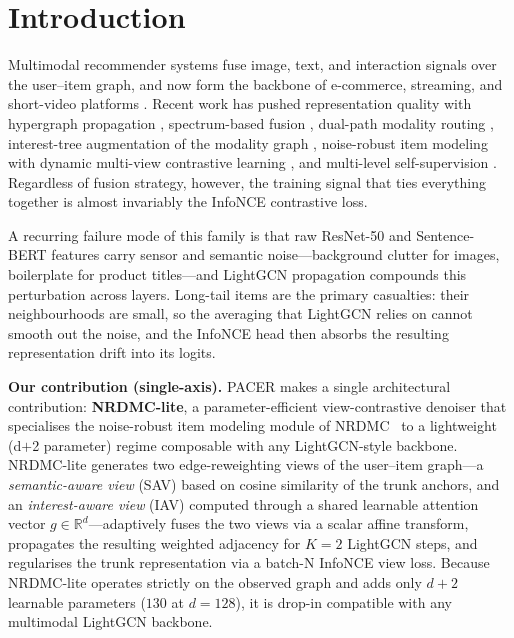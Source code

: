 \documentclass[conference]{IEEEtran}
\begin{document}
\section{Introduction}

Multimodal recommender systems fuse image, text, and interaction
signals over the user--item graph, and now form the backbone of
e-commerce, streaming, and short-video platforms
\cite{guo2025mmhcl,li2026multiview,hao2026itcohd}. Recent work has
pushed representation quality with hypergraph propagation
\cite{guo2025mmhcl,hao2026itcohd}, spectrum-based fusion
\cite{ong2025spectrum,wang2026damps}, dual-path modality routing
\cite{yan2025compensating}, interest-tree augmentation of the modality
graph \cite{meng2025tamer}, noise-robust item modeling with dynamic
multi-view contrastive learning \cite{gong2026noise}, and multi-level
self-supervision \cite{xu2025mentor}. Regardless of fusion strategy,
however, the training signal that ties everything together is almost
invariably the InfoNCE contrastive loss.

A recurring failure mode of this family is that raw ResNet-50 and
Sentence-BERT features carry sensor and semantic noise---background
clutter for images, boilerplate for product titles---and
LightGCN propagation compounds this perturbation across layers.
Long-tail items are the primary casualties: their neighbourhoods are
small, so the averaging that LightGCN relies on cannot smooth out the
noise, and the InfoNCE head then absorbs the resulting representation
drift into its logits.

\smallskip
\noindent\textbf{Our contribution (single-axis).}
PACER makes a single architectural contribution: \textbf{NRDMC-lite},
a parameter-efficient view-contrastive denoiser that specialises the
noise-robust item modeling module of NRDMC~\cite{gong2026noise} to a
lightweight (d${+}$2 parameter) regime composable with any
LightGCN-style backbone. NRDMC-lite generates two edge-reweighting
views of the user--item graph---a \emph{semantic-aware view} (SAV)
based on cosine similarity of the trunk anchors, and an
\emph{interest-aware view} (IAV) computed through a shared learnable
attention vector $g\in\mathbb{R}^{d}$---adaptively fuses the two
views via a scalar affine transform, propagates the resulting
weighted adjacency for $K{=}2$ LightGCN steps, and regularises the
trunk representation via a batch-N InfoNCE view loss. Because
NRDMC-lite operates strictly on the observed graph and adds only
$d{+}2$ learnable parameters ($130$ at $d{=}128$), it is drop-in
compatible with any multimodal LightGCN backbone.
\end{document}
